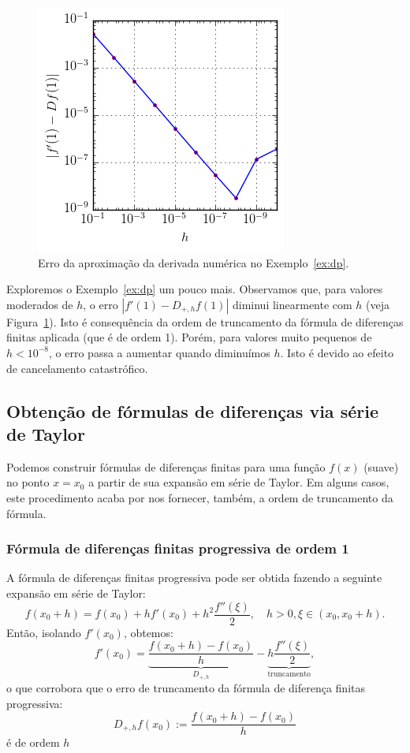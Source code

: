 \begin{figure}
  \centering
  \includegraphics{./cap_derint/pics/ex_derivacao/ex_derivacao}
  \caption{Erro da aproximação da derivada numérica no Exemplo~\ref{ex:dp}.}
  \label{fig:ex_derivacao}
\end{figure}

Exploremos o Exemplo~\ref{ex:dp} um pouco mais. Observamos que, para valores moderados de $h$, o erro $|f'(1)-D_{+,h}f(1)|$ diminui linearmente com $h$ (veja Figura~\ref{fig:ex_derivacao}). Isto é consequência da ordem de truncamento da fórmula de diferenças finitas aplicada (que é de ordem 1). Porém, para valores muito pequenos de $h < 10^{-8}$, o erro passa a aumentar quando diminuímos $h$. Isto é devido ao efeito de cancelamento catastrófico.

\subsection{Obtenção de fórmulas de diferenças via série de Taylor}

Podemos construir fórmulas de diferenças finitas para uma função $f(x)$ (suave) no ponto $x = x_0$ a partir de sua expansão em série de Taylor. Em alguns casos, este procedimento acaba por nos fornecer, também, a ordem de truncamento da fórmula.

\subsubsection{Fórmula de diferenças finitas progressiva de ordem 1}

A fórmula de diferenças finitas progressiva pode ser obtida fazendo a seguinte expansão em série de Taylor:
\begin{equation*}
  f(x_0+h) = f(x_0) + hf'(x_0) + h^2\frac{f''(\xi)}{2},\quad h>0, \xi\in(x_0,x_0+h).
\end{equation*}
Então, isolando $f'(x_0)$, obtemos:
\begin{equation*}
  f'(x_0) = \underbrace{\frac{f(x_0+h) - f(x_0)}{h}}_{D_{+,h}} - \underbrace{h\frac{f''(\xi)}{2}}_{\text{truncamento}},
\end{equation*}
o que corrobora que o erro de truncamento da fórmula de diferença finitas progressiva:
\begin{equation*}
  D_{+,h}f(x_0) := \frac{f(x_0+h)-f(x_0)}{h}  
\end{equation*}
é de ordem $h$

